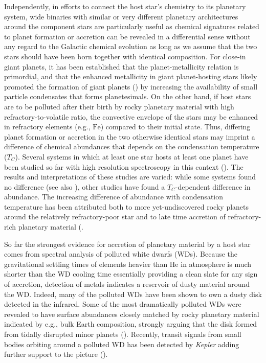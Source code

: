 \documentclass[manuscript]{aastex6}
\newcommand{\project}[1]{\textsl{#1}}
\newcommand*\elem[1]{\ensuremath{\mathrm{#1}}}
\newcommand{\Tcondens}{\ensuremath{T_C}}
\begin{document}
Independently, in efforts to connect the host star's chemistry to
its planetary system, wide binaries with similar or very different planetary architectures around
the component stars are particularly useful as chemical signatures related to planet formation or accretion
can be revealed in a differential sense without any regard to the Galactic chemical evolution
as long as we assume that the two stars should have been born together with identical composition.
For close-in giant planets, it has been established that the planet-metallicity relation
is primordial, and that the enhanced metallicity in giant planet-hosting stars likely
promoted the formation of giant planets (\citealt{Fischer:2005aa}) by increasing
the availability of small particle condensates that forms planetesimals.
On the other hand, if host stars are to be polluted after their birth
by rocky planetary material with high refractory-to-volatile ratio,
the convective envelope of the stars may be enhanced in refractory elements (e.g., \elem{Fe})
compared to their initial state.
Thus, differing planet formation or accretion in the two otherwise identical stars
may imprint a difference of chemical abundances that depends on the
condensation temperature (\Tcondens).
Several systems in which at least one star hosts at least one planet
have been studied so far with high resolution spectroscopy in this context
(\citealt{Teske:2013aa,Mack:2014aa,Liu:2014aa,Teske:2015aa,Saffe:2015aa,
  Ramirez:2015aa,Biazzo:2015aa,Mack:2016aa,Teske:2016aa,Teske:2016ab}).
The results and interpretations of these studies are varied: while some systems
found no difference (see also \citealt{Desidera:2004aa,Gratton:2001aa}), other
studies  have found a \Tcondens-dependent difference in abundance.
The increasing difference of abundance with condensation temperature
has been attributed both to more yet-undiscovered rocky planets around
the relatively refractory-poor star and to late time accretion of
refractory-rich planetary material (\citealt{Ramirez:2015aa,Biazzo:2015aa}.

So far the strongest evidence for accretion of planetary material by a host star comes
from spectral analysis of polluted white dwarfs (WDs).
Because the gravitational settling times of elements heavier than \elem{He} in
atmosphere is much shorter than the WD cooling time essentially providing a
clean slate for any sign of accretion, detection of metals indicates a
reservoir of dusty material around the WD.
Indeed, many of the polluted WDs have been shown to own a dusty disk detected
in the infrared.
Some of the most dramatically polluted WDs were revealed to have
surface abundances closely matched by rocky planetary material
indicated by e.g., bulk Earth composition, strongly arguing
that the disk formed from tidally disrupted minor planets
(\citealt{Zuckerman:2007aa,Klein:2010aa}).
Recently, transit signals from small bodies orbiting around a polluted WD
has been detected by \project{Kepler} adding further support to the picture
(\citealt{2015Natur.526..546V}).
\end{document}
